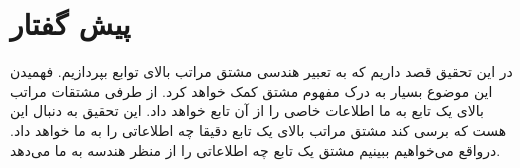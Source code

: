 \maketitle
\newpage

\tableofcontents
\newpage

\section{پیش گفتار}
در این تحقیق قصد داریم که به تعبیر هندسی مشتق مراتب بالای توابع بپردازیم. فهمیدن این موضوع بسیار به درک مفهوم مشتق کمک خواهد کرد.
از طرفی مشتقات مراتب بالای یک تابع به ما اطلاعات خاصی را از آن تابع خواهد داد. این تحقیق به دنبال این هست که برسی کند مشتق مراتب بالای یک تابع دقیقا چه اطلاعاتی را به ما خواهد داد.
درواقع می‌خواهیم ببینیم مشتق یک تابع چه اطلاعاتی را از منظر هندسه به ما می‌دهد.
